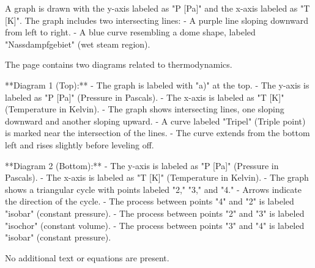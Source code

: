 A graph is drawn with the y-axis labeled as "P [Pa]" and the x-axis labeled as "T [K]". The graph includes two intersecting lines:  
- A purple line sloping downward from left to right.  
- A blue curve resembling a dome shape, labeled "Nassdampfgebiet" (wet steam region).

The page contains two diagrams related to thermodynamics.  

**Diagram 1 (Top):**  
- The graph is labeled with "a)" at the top.  
- The y-axis is labeled as "P [Pa]" (Pressure in Pascals).  
- The x-axis is labeled as "T [K]" (Temperature in Kelvin).  
- The graph shows intersecting lines, one sloping downward and another sloping upward.  
- A curve labeled "Tripel" (Triple point) is marked near the intersection of the lines.  
- The curve extends from the bottom left and rises slightly before leveling off.  

**Diagram 2 (Bottom):**  
- The y-axis is labeled as "P [Pa]" (Pressure in Pascals).  
- The x-axis is labeled as "T [K]" (Temperature in Kelvin).  
- The graph shows a triangular cycle with points labeled "2," "3," and "4."  
- Arrows indicate the direction of the cycle.  
- The process between points "4" and "2" is labeled "isobar" (constant pressure).  
- The process between points "2" and "3" is labeled "isochor" (constant volume).  
- The process between points "3" and "4" is labeled "isobar" (constant pressure).  

No additional text or equations are present.